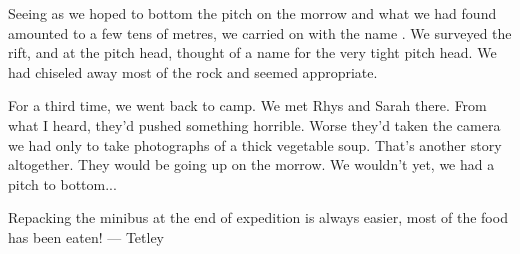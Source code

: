 Seeing as we hoped to bottom the pitch on the morrow and what we had found amounted to a few tens of metres, we carried on with the name . We surveyed the rift, and at the pitch head, thought of a name for the very tight pitch head. We had chiseled away most of the rock and  seemed appropriate.

For a third time, we went back to camp. We met Rhys and Sarah there. From what I heard, they'd pushed something horrible. Worse they'd taken the camera we had only to take photographs of a thick vegetable soup. That's another story altogether. They would be going up on the morrow. We wouldn't yet, we had a pitch to bottom...

\begin{marginfigure}
\label{packing the bus}
\caption{Repacking the minibus at the end of expedition is always easier, most of the food has been eaten!  --- Tetley}
\end{marginfigure}

